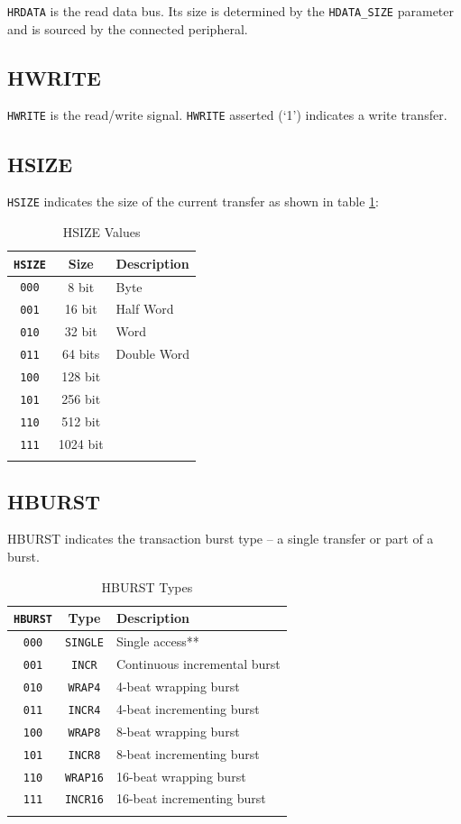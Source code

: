 \texttt{HRDATA} is the read data bus. Its size is determined by the
\texttt{HDATA\_SIZE} parameter and is sourced by the connected
peripheral.

\subsection{HWRITE}

\texttt{HWRITE} is the read/write signal. \texttt{HWRITE} asserted (`1')
indicates a write transfer.

\subsection{HSIZE}

\texttt{HSIZE} indicates the size of the current transfer as shown in table \ref{tab:HSIZE}:

\begin{longtable}[c]{@{\extracolsep{\fill}}ccl}	
	\toprule 
	\textbf{\texttt{HSIZE}} & \textbf{Size} & \textbf{Description}\\
	\midrule
	\endhead 
	\texttt{000} & 8 bit    & Byte\\
	\texttt{001} & 16 bit   & Half Word\\
	\texttt{010} & 32 bit   & Word\\
	\texttt{011} & 64 bits  & Double Word\\
	\texttt{100} & 128 bit  &\\
	\texttt{101} & 256 bit  &\\
	\texttt{110} & 512 bit  &\\
	\texttt{111} & 1024 bit &\\
	\bottomrule 	
	\caption{HSIZE Values}
	\label{tab:HSIZE}
\end{longtable}

\subsection{HBURST}

HBURST indicates the transaction burst type -- a single transfer or part
of a burst.

\begin{longtable}[c]{@{\extracolsep{\fill}}ccl}	
	\toprule 
	\textbf{\texttt{HBURST}} & \textbf{Type} & \textbf{Description}\\
	\midrule
	\endhead 
	\texttt{000} & \texttt{SINGLE} & Single access**\\
	\texttt{001} & \texttt{INCR}   & Continuous incremental burst\\
	\texttt{010} & \texttt{WRAP4}  & 4-beat wrapping burst\\
	\texttt{011} & \texttt{INCR4}  & 4-beat incrementing burst\\
	\texttt{100} & \texttt{WRAP8}  & 8-beat wrapping burst\\
	\texttt{101} & \texttt{INCR8}  & 8-beat incrementing burst\\
	\texttt{110} & \texttt{WRAP16} & 16-beat wrapping burst\\
	\texttt{111} & \texttt{INCR16} & 16-beat incrementing burst\\
	\bottomrule 	
	\caption{HBURST Types}
	\label{tab:HBURST}
\end{longtable}

